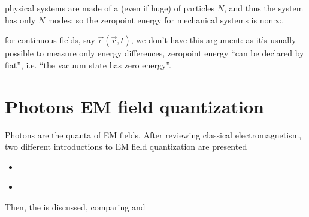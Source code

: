 \documentclass[letterpaper,10pt,english]{jupyterBook}
\begin{document}
\sphinxAtStartPar
{} physical systems are made of a  (even if huge) of particles \(N\), and thus the system has only \(N\) modes: so the zero\sphinxhyphen{}point energy for mechanical systems is non\sphinxhyphen{}\(\infty\).

\sphinxAtStartPar
{} for continuous fields, say \(\vec e(\vec r,t)\), we don’t have this argument: as it’s usually possible to measure only energy differences, zero\sphinxhyphen{}point energy “can be declared by fiat”, i.e. “the vacuum state has zero energy”.

\sphinxstepscope


\section{Photons \sphinxhyphen{} EM field quantization}
\label{\detokenize{ch/quantum-mechanics/qft/photons:photons-em-field-quantization}}\label{\detokenize{ch/quantum-mechanics/qft/photons:quantum-mechanics-qft-photons}}\label{\detokenize{ch/quantum-mechanics/qft/photons::doc}}
\sphinxAtStartPar
Photons are the quanta of EM fields. After reviewing classical electromagnetism, two different introductions to EM field quantization are presented
\begin{itemize}
\item {} 
\sphinxAtStartPar
{\hyperref[\detokenize{ch/quantum-mechanics/qft/photons:quantum-mechanics-qft-photons-em-field-quantization-fermi}]{}}

\item {} 
\sphinxAtStartPar
{\hyperref[\detokenize{ch/quantum-mechanics/qft/photons:quantum-mechanics-qft-photons-em-field-quantization-free-space}]{}}

\end{itemize}

\sphinxAtStartPar
Then, the {\hyperref[\detokenize{ch/quantum-mechanics/qft/photons:quantum-mechanics-qft-photons-em-field-quantization-classical-limit}]{}} is discussed, comparing {\hyperref[\detokenize{ch/quantum-mechanics/qft/photons:quantum-mechanics-qft-photons-em-field-quantization-classical-limit-incoherent-states}]{}} and {\hyperref[\detokenize{ch/quantum-mechanics/qft/photons:quantum-mechanics-qft-photons-em-field-quantization-classical-limit-coherent-states}]{}}
\end{document}
